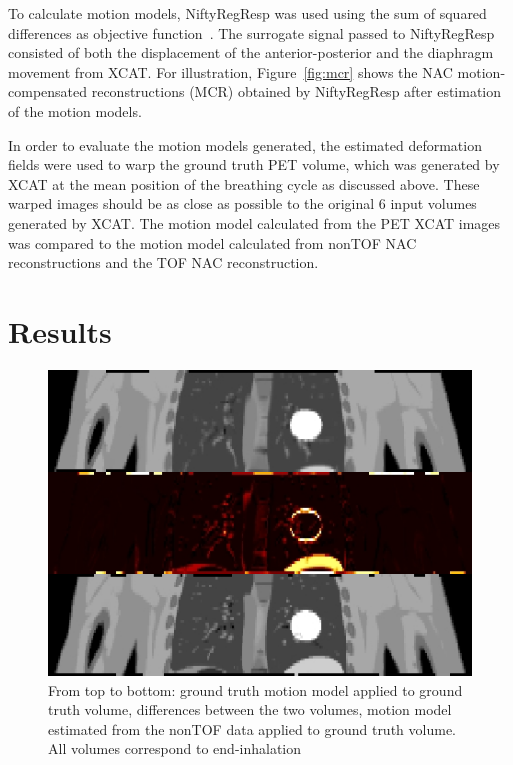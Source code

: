 \documentclass[9pt]{IEEEtran}
\begin{document}
To calculate motion models, NiftyRegResp was used using the sum of squared differences as objective function~\cite{NiftyRegResp}. The surrogate signal passed to NiftyRegResp consisted of both the displacement of the anterior-posterior and the  diaphragm movement from XCAT. For illustration, Figure~\ref{fig:mcr} shows the NAC motion-compensated reconstructions (MCR) obtained by NiftyRegResp after estimation of the motion models.

In order to evaluate the motion models generated, the estimated deformation fields were used to warp the ground truth PET volume, which was generated by XCAT at the mean position of the breathing cycle as discussed above. These warped images should be as close as possible to the original 6 input volumes generated by XCAT. The motion model calculated from the PET XCAT images was compared to the motion model calculated from nonTOF NAC reconstructions and the TOF NAC reconstruction.  


\section{Results}
\begin{figure}
    \centering
    \includegraphics[scale=0.3]{figures/non_tof.png}
    \caption{From top to bottom: ground truth motion model applied to ground truth volume, differences between the two volumes, motion model estimated from the nonTOF data applied to ground truth volume. All volumes correspond to end-inhalation}
    \label{fig:non_tof}
\end{figure}
\end{document}
